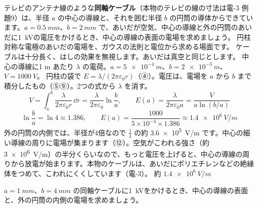 \label{ph:電-2:ex10}
\begin{phreidai}[同軸ケーブルの中の電場]
テレビのアンテナ線のような\textbf{同軸ケーブル}（本物のテレビの線の寸法は電-3 例題9）は、半径 $a$ の中心の導線と、それを囲む半径 $b$ の円筒の導体からできています。$a=\qty{0.5}{mm}$、$b=\qty{2}{mm}$ で、あいだが空気、中心の導線と外の円筒のあいだに\qty{1}{kV}の電圧をかけるとき、中心の導線の表面の電場を求めましょう。
\phbamen
円柱対称な電極のあいだの電場を、ガウスの法則と電位から求める場面です。
\phmushi
ケーブルは十分長く、はしの効果を無視します。あいだは真空と同じとします。
\phzu
中心の導線に1 m あたり $\lambda$ の電荷。$a=\qty{5e-4}{m}$、$b=\qty{2e-3}{m}$、$V=\qty{1000}{V}$。
\phriyu
円柱の袋で $E=\lambda/(2\pi\varepsilon_0r)$（④）。電圧は、電場を $a$ から $b$ まで積分したもの（⑤⑨）。2つの式から $\lambda$ を消す。
\phtateru
\[V=\int_a^b\frac{\lambda}{2\pi\varepsilon_0r}\,\dd r=\frac{\lambda}{2\pi\varepsilon_0}\ln\frac{b}{a},\qquad E(a)=\frac{\lambda}{2\pi\varepsilon_0a}=\frac{V}{a\ln(b/a)}\]
\phtoku
\[\ln\frac{b}{a}=\ln4\approx1.386,\qquad E(a)=\frac{1000}{5\times10^{-4}\times1.386}\approx\qty{1.4e6}{V/m}\]
\phtashikame
外の円筒の内側では、半径が4倍なので $\tfrac14$ の約 \qty{3.6e5}{V/m} です。中心の細い導線の周りに電場が集まります（⑫）。空気がこわれる強さ（約 \qty{3e6}{V/m}）の半分くらいなので、もっと電圧を上げると、中心の導線の周りから放電が始まります。本物のケーブルは、あいだにポリエチレンなどの絶縁体をつめて、こわれにくくしています（電-3）。
\kotae 約 $\qty{1.4e6}{V/m}$
\end{phreidai}
\begin{jibun}
$a=\qty{1}{mm}$、$b=\qty{4}{mm}$ の同軸ケーブルに\qty{1}{kV}をかけるとき、中心の導線の表面と、外の円筒の内側の電場を求めましょう。
\end{jibun}

